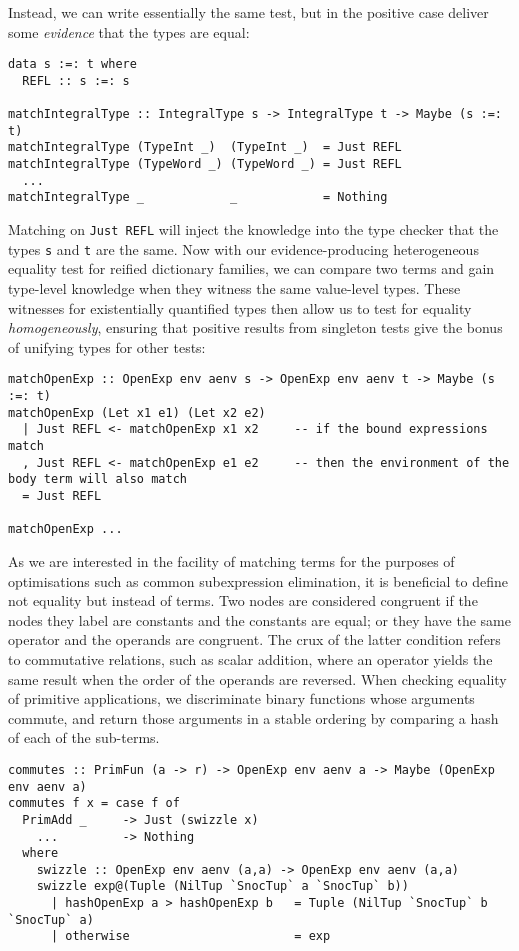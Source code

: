 Instead, we can write essentially the same test, but in the positive case
deliver some \emph{evidence} that the types are equal:
%
\begin{lstlisting}[style=haskell]
data s :=: t where
  REFL :: s :=: s

matchIntegralType :: IntegralType s -> IntegralType t -> Maybe (s :=: t)
matchIntegralType (TypeInt _)  (TypeInt _)  = Just REFL
matchIntegralType (TypeWord _) (TypeWord _) = Just REFL
  ...
matchIntegralType _            _            = Nothing
\end{lstlisting}
%
Matching on \lstinline{Just REFL} will inject the knowledge into the type
checker that the types \texttt{s} and \texttt{t} are the same. Now with our
evidence-producing heterogeneous equality test for reified dictionary families,
we can compare two terms and gain type-level knowledge when they witness the
same value-level types. These witnesses for existentially quantified types then
allow us to test for equality \emph{homogeneously}, ensuring that positive
results from singleton tests give the bonus of unifying types for other tests:
%
\begin{lstlisting}[style=haskell]
matchOpenExp :: OpenExp env aenv s -> OpenExp env aenv t -> Maybe (s :=: t)
matchOpenExp (Let x1 e1) (Let x2 e2)
  | Just REFL <- matchOpenExp x1 x2     -- if the bound expressions match
  , Just REFL <- matchOpenExp e1 e2     -- then the environment of the body term will also match
  = Just REFL

matchOpenExp ...
\end{lstlisting}


As we are interested in the facility of matching terms for the purposes of
optimisations such as common subexpression elimination, it is beneficial to
define not equality but instead  of terms. Two nodes are
considered congruent if the nodes they label are constants and the constants are
equal; or they have the same operator and the operands are congruent. The crux
of the latter condition refers to commutative relations, such as scalar
addition, where an operator yields the same result when the order of the
operands are reversed. When checking equality of primitive applications, we
discriminate binary functions whose arguments commute, and return those
arguments in a stable ordering by comparing a hash of each of the
sub-terms.
%
\begin{lstlisting}[style=haskell]
commutes :: PrimFun (a -> r) -> OpenExp env aenv a -> Maybe (OpenExp env aenv a)
commutes f x = case f of
  PrimAdd _     -> Just (swizzle x)
    ...         -> Nothing
  where
    swizzle :: OpenExp env aenv (a,a) -> OpenExp env aenv (a,a)
    swizzle exp@(Tuple (NilTup `SnocTup` a `SnocTup` b))
      | hashOpenExp a > hashOpenExp b   = Tuple (NilTup `SnocTup` b `SnocTup` a)
      | otherwise                       = exp
\end{lstlisting}


